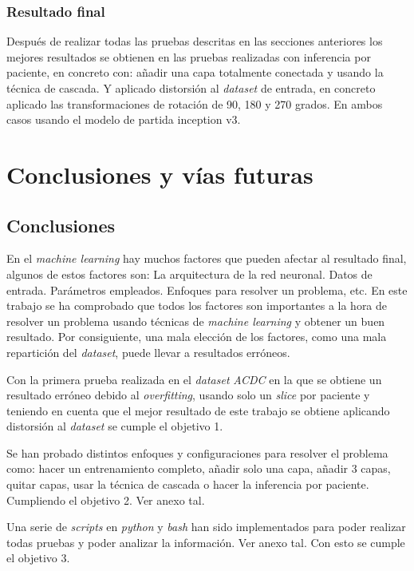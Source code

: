 \documentclass[12pt,a4paper]{article}
\begin{document}
\subsubsection{Resultado final}
Después de realizar todas las pruebas descritas en las secciones anteriores los mejores resultados se obtienen en las pruebas realizadas con inferencia por paciente, en concreto con: añadir una capa totalmente conectada y usando la técnica de cascada. Y aplicado distorsión al \textit{dataset} de entrada, en concreto aplicado las transformaciones de rotación de 90, 180 y 270 grados. En ambos casos usando el modelo de partida inception v3.

\newpage
\section{Conclusiones y vías futuras}
\subsection{Conclusiones}
En el \textit{machine learning} hay muchos factores que pueden afectar al resultado final, algunos de estos factores son: La arquitectura de la red neuronal. Datos de entrada. Parámetros empleados. Enfoques para resolver un problema, etc. En este trabajo se ha comprobado que todos los factores son importantes a la hora de resolver un problema usando técnicas de \textit{machine learning} y obtener un buen resultado. Por consiguiente, una mala elección de los factores, como una mala repartición del \textit{dataset}, puede llevar a resultados erróneos.
\bigskip

Con la primera prueba realizada en el \textit{dataset} \textit{ACDC} en la que se obtiene un resultado erróneo debido al \textit{overfitting}, usando solo un \textit{slice} por paciente y teniendo en cuenta que el mejor resultado de este trabajo se obtiene aplicando distorsión al \textit{dataset} se cumple el objetivo 1.
\bigskip

Se han probado distintos enfoques y configuraciones para resolver el problema como: hacer un entrenamiento completo, añadir solo una capa, añadir 3 capas, quitar capas, usar la técnica de cascada o hacer la inferencia por paciente. Cumpliendo el objetivo 2. Ver anexo tal.
\bigskip

Una serie de \textit{scripts} en \textit{python} y \textit{bash} han sido implementados para poder realizar todas pruebas y poder analizar la información. Ver anexo tal. Con esto se cumple el objetivo 3.
\bigskip
\end{document}

